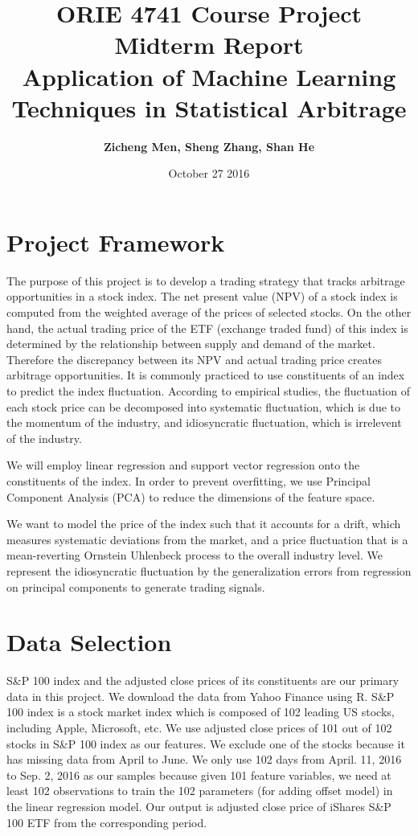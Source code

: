 \documentclass[letterpaper,12pt]{article}
\numberwithin{equation}{section}
\begin{document}
\allowdisplaybreaks


\title{\Large \bf
ORIE 4741 Course Project Midterm Report\\
Application of Machine Learning Techniques in Statistical Arbitrage
}
\author{{\bf Zicheng Men, Sheng Zhang, Shan He}}
\date{October 27 2016}
\maketitle

\section{Project Framework}
The purpose of this project is to develop a trading strategy that tracks arbitrage opportunities in a stock index. The net present value (NPV) of a stock index is computed from the weighted average of the prices of selected stocks. On the other hand, the actual trading price of the ETF (exchange traded fund) of this index is determined by the relationship between supply and demand of the market. Therefore the discrepancy between its NPV and actual trading price creates arbitrage opportunities. It is commonly practiced to use constituents of an index to predict the index fluctuation. According to empirical studies, the fluctuation of each stock price can be decomposed into systematic fluctuation, which is due to the momentum of the industry, and idiosyncratic fluctuation, which is irrelevent of the industry.

We will employ linear regression and support vector regression onto the constituents of the index. In order to prevent overfitting, we use Principal Component Analysis (PCA) to reduce the dimensions of the feature space.

We want to model the price of the index such that it accounts for a drift, which measures systematic deviations from the market, and a price fluctuation that is a mean-reverting Ornstein Uhlenbeck process to the overall industry level. We represent the idiosyncratic fluctuation by the generalization errors from regression on principal components to generate trading signals. 

\section{Data Selection}

S\&P 100 index and the adjusted close prices of its constituents are our primary data in this project. We download the data from Yahoo Finance using R. S\&P 100 index is a stock market index which is composed of 102 leading US stocks, including Apple, Microsoft, etc. We use adjusted close prices of 101 out of 102 stocks in S\&P 100 index as our features. We exclude one of the stocks because it has missing data from April to June. We only use 102 days from April. 11, 2016 to Sep. 2, 2016 as our samples because given 101 feature variables, we need at least 102 observations to train the 102 parameters (for adding offset model) in the linear regression model. Our output is adjusted close price of iShares S\&P 100 ETF from the corresponding period.
\end{document}
